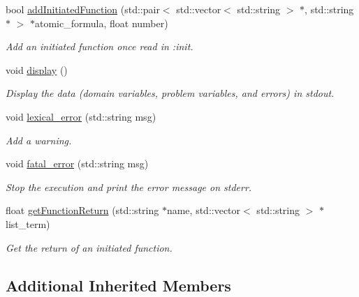 \begin{DoxyCompactItemize}
bool \hyperlink{classParser_ab243bf4f6ec47e9c10c42509d0ed14ec}{add\+Initiated\+Function} (std\+::pair$<$ std\+::vector$<$ std\+::string $>$ $\ast$, std\+::string $\ast$ $>$ $\ast$atomic\+\_\+formula, float number)
\begin{DoxyCompactList}\small\item\em Add an initiated function once read in \+:init. \end{DoxyCompactList}\item 
\hypertarget{classParser_a90540c5d1f12d7a5974efdf526fb6d22}{void \hyperlink{classParser_a90540c5d1f12d7a5974efdf526fb6d22}{display} ()}\label{classParser_a90540c5d1f12d7a5974efdf526fb6d22}

\begin{DoxyCompactList}\small\item\em Display the data (domain variables, problem variables, and errors) in stdout. \end{DoxyCompactList}\item 
void \hyperlink{classParser_ab2075cf762895993dc7583855350203b}{lexical\+\_\+error} (std\+::string msg)
\begin{DoxyCompactList}\small\item\em Add a warning. \end{DoxyCompactList}\item 
void \hyperlink{classParser_a1dd4f26466b3b3e51046cd8dfa085a4f}{fatal\+\_\+error} (std\+::string msg)
\begin{DoxyCompactList}\small\item\em Stop the execution and print the error message on stderr. \end{DoxyCompactList}\item 
float \hyperlink{classParser_acdaf00eb98e4f6fe1b834bc23173566c}{get\+Function\+Return} (std\+::string $\ast$name, std\+::vector$<$ std\+::string $>$ $\ast$list\+\_\+term)
\begin{DoxyCompactList}\small\item\em Get the return of an initiated function. \end{DoxyCompactList}\end{DoxyCompactItemize}
\subsection*{Additional Inherited Members}


